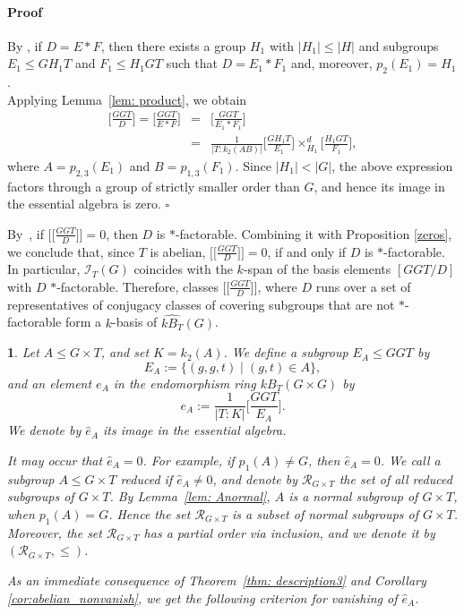 \documentclass[12pt]{article}
\theoremstyle{change}
\newtheorem{nothing}[theorem]{}
\newenvironment{proof}{\paragraph{Proof}}{\hfill$\square$}
\newcommand{\calI}{\mathcal{I}}
\newcommand{\calR}{\mathcal{R}}
\newcommand{\1}{{\bf 1}}
\begin{document}
\begin{proof}
By \cite[Lemma 3.4]{R1}, if $D = E * F$, then there exists a group $H_1$ with $|H_1| \leq |H|$ and subgroups $E_1 \leq GH_1T$ and $F_1 \leq H_1GT$ such that $D = E_1 * F_1$ and, moreover, $p_2(E_1) = H_1$.\\
Applying Lemma~\ref{lem: product}, we obtain
\begin{eqnarray*}
\Big[\frac{GGT}{D}\Big] 
= \Big[\frac{GGT}{E * F}\Big] 
&=& \Big[\frac{GGT}{E_1 * F_1}\Big]\\
&=& \frac{1}{|T : k_2(AB)|} \Big[\frac{GH_1T}{E_1}\Big]\times_{H_1}^d \Big[\frac{H_1GT}{F_1}\Big],
\end{eqnarray*}
where $A=p_{2,3}(E_1)$ and $B=p_{1,3}(F_1)$. Since $|H_1| < |G|$, the above expression factors through a group of strictly smaller order than $G$, and hence its image in the essential algebra is zero.
\end{proof}

By~\cite[Lemma 3.2]{R1}, if \(\Big[\Big[\frac{GGT}{D}\Big]\Big] = 0\), then \(D\) is $\ast$-factorable. Combining it with Proposition \ref{zeros}, we conclude that, since $T$ is abelian, \(\Big[\Big[\frac{GGT}{D}\Big]\Big] = 0\), if and only if \(D\) is $\ast$-factorable. In particular, $\calI_T(G)$ coincides with the $k$-span of the basis elements $[GGT/D]$ with $D$ $\ast$-factorable. Therefore, classes $\big[\big[\tfrac{GGT}{D}\big]\big]$, where $D$ runs over a set of representatives of conjugacy classes of covering subgroups that are not $\ast$-factorable form a $k$-basis of $\widehat{kB_T}(G)$.


\begin{nothing}
Let $A \leq G\times T$, and set $K = k_2(A)$. We define a subgroup $E_A \leq GGT$ by
\[
E_A := \{(g,g,t) \mid (g,t)\in A\},
\]
and an element $e_A$ in the endomorphism ring $kB_T(G\times G)$ by
\[
e_A := \frac{1}{|T:K|}\Big[\frac{GGT}{E_A}\Big].
\]
We denote by $\widehat{e}_A$ its image in the essential algebra.

It may occur that $\widehat{e}_A=0$. For example, if $p_1(A) \neq G$, then $\widehat{e}_A=0$. We call a subgroup $A \leq G\times T$ \emph{reduced} if $\widehat{e}_A \neq 0$, and denote by $\calR_{G\times T}$ the set of all reduced subgroups of $G\times T$. By Lemma~\ref{lem: Anormal}, $A$ is a normal subgroup of $G\times T$, when $p_1(A)=G$. Hence the set $\calR_{G\times T}$ is a subset of normal subgroups of $G\times T$. Moreover, the set $\calR_{G\times T}$ has a partial order via inclusion, and we denote it by $(\calR_{G\times T},\leq)$. 

As an immediate consequence of Theorem~\ref{thm: description3} and Corollary \ref{cor:abelian_nonvanish}, we get the following criterion for vanishing of $\widehat{e}_A$.
\end{nothing}
\end{document}
